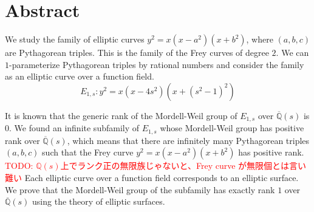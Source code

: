 \documentclass[main]{subfiles}
\begin{document}
\chapter{Abstract}
We study the family of elliptic curves $y^2 = x (x - a^2)(x+b^2)$, where $(a,b,c)$ are Pythagorean triples.
This is the family of the Frey curves of degree $2$.
We can $1$-parameterize Pythagorean triples by rational numbers and consider the family as an elliptic curve over a function field.
\begin{equation}
    E_{1,s}: y^{2} = x(x - 4s^{2})(x + (s^{2} - 1)^{2})
\end{equation}

It is known that the generic rank of the Mordell-Weil group of $E_{1,s}$ over $\overline{\mathbb{Q}}(s)$ is $0$.
We found an infinite subfamily of $E_{1,s}$ whose Mordell-Weil group has positive rank over $\overline{\mathbb{Q}}(s)$, which means that there are infinitely many Pythagorean triples $(a,b,c)$ such that the Frey curve $y^2 = x (x - a^2)(x+b^2)$ has positive rank.
\textcolor{red}{TODO: $\mathbb{Q}(s)$上でランク正の無限族じゃないと、Frey curve が無限個とは言い難い}
Each elliptic curve over a function field corresponds to an elliptic surface.
We prove that the Mordell-Weil group of the subfamily has exactly rank $1$ over $\overline{\mathbb{Q}}(s)$ using the theory of elliptic surfaces.
\end{document}
